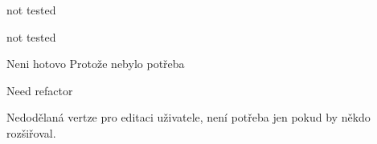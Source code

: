 
\begin{DoxyRefList}
\item[\label{bug__bug000003}%
\hypertarget{bug__bug000003}{}%
Třída \hyperlink{class_mail}{Mail} ]not tested  
\item[\label{bug__bug000004}%
\hypertarget{bug__bug000004}{}%
Člen \hyperlink{class_mail_af417209698de86b91be75a221d4650de}{Mail\-:\-:Send} ()]not tested  
\item[\label{bug__bug000005}%
\hypertarget{bug__bug000005}{}%
Člen \hyperlink{class_request_acb45c1bd5a1e720a43eb5c71735515ea}{Request\-:\-:Choose\-By\-Id} (\$id)]Neni hotovo Protože nebylo potřeba  
\item[\label{bug__bug000006}%
\hypertarget{bug__bug000006}{}%
Třída \hyperlink{class_user_manager}{User\-Manager} ]Need refactor 
\item[\label{bug__bug000007}%
\hypertarget{bug__bug000007}{}%
Člen \hyperlink{class_user_manager_a9f8ffffb65641f622d58a6a68c2992db}{User\-Manager\-:\-:User\-To\-D\-B} (\$user)]Nedodělaná vertze pro editaci uživatele, není potřeba jen pokud by někdo rozšiřoval. 
\end{DoxyRefList}